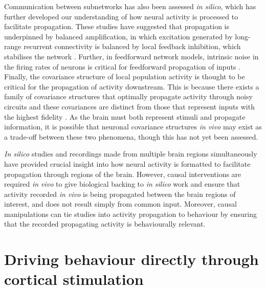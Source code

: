 Communication between subnetworks has also been assessed \textit{in silico}, which has further developed our understanding of how neural activity is processed to facilitate propagation. These studies have suggested that propagation is underpinned by balanced amplification, in which excitation generated by long-range recurrent connectivity is balanced by local feedback inhibition, which stabilises the network \cite{joglekar_inter-areal_2018}. Further, in feedforward network models, intrinsic noise in the firing rates of neurons is critical for feedforward propagation of inputs \cite{vogels_signal_2005, ozer_weak_2010}. Finally, the covariance structure of local population activity is thought to be critical for the propagation of activity downstream. This is because there exists a family of covariance structures that optimally propagate activity through noisy circuits and these covariances are distinct from those that represent inputs with the highest fidelity \cite{zylberberg_robust_2017}. As the brain must both represent stimuli and propagate information, it is possible that neuronal covariance structures \textit{in vivo} may exist as a trade-off between these two phenomena, though this has not yet been assessed.  

\textit{In silico} studies and recordings made from multiple brain regions simultaneously have provided crucial insight into how neural activity is formatted to facilitate propagation through regions of the brain. However, causal interventions are required \textit{in vivo} to give biological backing to \textit{in silico} work and ensure that activity recorded \textit{in vivo} is being propagated between the brain regions of interest, and does not result simply from common input. Moreover, causal manipulations can tie studies into activity propagation to behaviour by ensuring that the recorded propagating activity is behaviourally relevant. 

\section{Driving behaviour directly through cortical stimulation}

